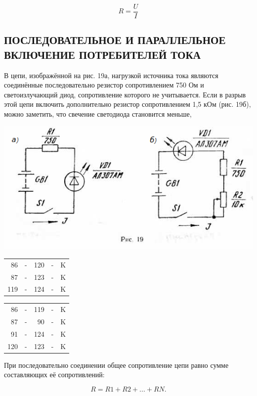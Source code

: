 \documentclass[12pt]{article}
\begin{document}
\begin{equation}
R = \frac{U}{I}
\label{Ohm_law3}
\end{equation} 

\subsection{ПОСЛЕДОВАТЕЛЬНОЕ И ПАРАЛЛЕЛЬНОЕ ВКЛЮЧЕНИЕ ПОТРЕБИТЕЛЕЙ ТОКА}

В цепи, изображённой на рис. 19а, нагрузкой источника тока являются соединённые последовательно резистор сопротивлением 750 Ом и светоизлучающий диод, сопротивление которого не учитывается. Если в разрыв этой цепи включить дополнительно резистор сопротивлением 1,5 кОм (рис. 19б), можно заметить, что свечение светодиода становится меньше,

\newpage

\includegraphics[scale=0.9]{ekon3_016_1}

\hspace{2em}\begin{tabular}{rcrcr}
86  & - & 120 & - & K\\
87  & - & 123 & - & K\\
119 & - & 124 & - & K\\
\end{tabular}
\hspace{10em}\begin{tabular}{rcrcr}
86  & - & 119 & - & K\\
87  & - &  90 & - & K\\
91  & - & 124 & - & K\\
120 & - & 123 & - & K\\
\end{tabular}

При последовательно соединении общее сопротивление цепи равно сумме составляющих её сопротивлений:

\begin{equation}
R = R1 + R2 + ... + RN.
\label{Ohm_series}
\end{equation}
\end{document}
